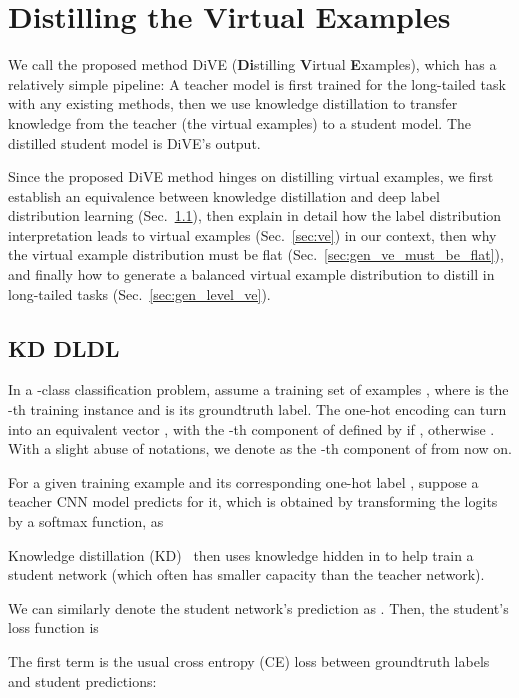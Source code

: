 \documentclass[10pt,twocolumn,letterpaper]{article}
\begin{document}
\section{Distilling the Virtual Examples}

We call the proposed method DiVE (\textbf{Di}stilling \textbf{V}irtual \textbf{E}xamples), which has a relatively simple pipeline: A teacher model is first trained for the long-tailed task with any existing methods, then we use knowledge distillation to transfer knowledge from the teacher (the virtual examples) to a student model. The distilled student model is DiVE’s output.

Since the proposed DiVE method hinges on distilling virtual examples, we first establish an equivalence between knowledge distillation and deep label distribution learning (Sec.~\ref{sec:kd=dldl}), then explain in detail how the label distribution interpretation leads to virtual examples (Sec.~\ref{sec:ve}) in our context, then why the virtual example distribution must be flat (Sec.~\ref{sec:gen_ve_must_be_flat}), and finally how to generate a balanced virtual example distribution to distill in long-tailed tasks (Sec.~\ref{sec:gen_level_ve}).

\subsection{KD  DLDL}\label{sec:kd=dldl}

In a -class classification problem, assume a training set of  examples , where  is the -th training instance and  is its groundtruth label. The one-hot encoding can turn  into an equivalent vector , with the -th component of  defined by  if , otherwise . With a slight abuse of notations, we denote  as the -th component of  from now on.

For a given training example  and its corresponding one-hot label , suppose a teacher CNN model predicts  for it, which is obtained by transforming the logits  by a softmax function, as

Knowledge distillation (KD)~\cite{hinton2015distilling} then uses knowledge hidden in  to help train a student network (which often has smaller capacity than the teacher network). 

We can similarly denote the student network’s prediction as . Then, the student’s loss function is

The first term is the usual cross entropy (CE) loss between groundtruth labels and student predictions:
 
\end{document}
